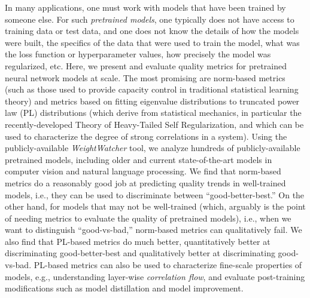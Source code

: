 
In many applications, one must work with models that have been trained by someone else.
For such \emph{pretrained models}, one typically does not have access to training data or test data, and one does not know the details of how the models were built, the specifics of the data that were used to train the model, what was the loss function or hyperparameter values, how precisely the model was regularized, etc.
Here, we present and evaluate quality metrics for pretrained neural network models at scale.
The most promising are norm-based metrics (such as those used to provide capacity control in traditional statistical learning theory) and metrics based on fitting eigenvalue distributions to truncated power law (PL) distributions (which derive from statistical mechanics, in particular the recently-developed Theory of Heavy-Tailed Self Regularization, and which can be used to characterize the degree of strong correlations in a system). 
%
Using the publicly-available \emph{WeightWatcher} tool, we analyze hundreds of publicly-available pretrained models, including older and current state-of-the-art models in computer vision and natural language processing.
We find that norm-based metrics do a reasonably good job at predicting quality trends in well-trained models, i.e., they can be used to discriminate between ``good-better-best.'' 
On the other hand, for models that may not be well-trained (which, arguably is the point of needing metrics to evaluate the quality of pretrained models), i.e., when we want to distinguish ``good-vs-bad,'' norm-based metrics can qualitatively fail. 
We also find that PL-based metrics do much better, quantitatively better at discriminating good-better-best and qualitatively better at discriminating good-vs-bad.
PL-based metrics can also be used to characterize fine-scale properties of models, e.g., understanding layer-wise \emph{correlation flow}, and evaluate post-training modifications such as model distillation and model improvement.


